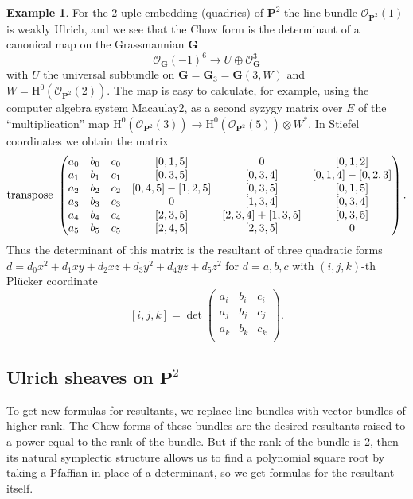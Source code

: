 \documentclass{jams-l}
\theoremstyle{definition}
\newtheorem{example}[theorem]{Example}
\theoremstyle{remark}
\newcommand{\GG}{{\mathbf G}}
\newcommand{\Hrm}{{\mathrm H}}
\newcommand{\Ocal}{{\mathcal O}}
\newcommand{\cO}{{\mathcal O}}
\newcommand{\PP}{{\mathbf P}}
\newcommand{\tensor}{\otimes}
\begin{document}
\begin{example}\label{quadrics on P2}
For the 2-uple embedding (quadrics) of
$\PP^2$ the line bundle $\Ocal_{\PP^2}(1)$ is weakly Ulrich,
and we see that the Chow form is the determinant
of a canonical map on the Grassmannian $\GG$
\[
\Ocal_\GG(-1)^6\to U \oplus \Ocal_\GG^3
\]
with $U$ the universal subbundle on $\GG=\GG_3=\GG(3,W)$ and $W=\Hrm^0(\cO_{\PP^2}(2))$.
The map is easy to calculate, for example,
using the computer algebra system Macaulay2,
 as a second syzygy matrix over $E$ of the ``multiplication'' map \linebreak
$\Hrm^0(\cO_{\PP^2}(3)) \to \Hrm^0(\cO_{\PP^2}(5)) \tensor W^*$.
In Stiefel coordinates we obtain the matrix 
\[\hbox{transpose }\begin{pmatrix}
a_0 & b_0 & c_0 & {\scriptstyle[0,1,5]}           &0                  &{\scriptstyle [0,1,2] }\\
a_1 & b_1 & c_1 &{\scriptstyle [0,3,5]}           &{\scriptstyle [0,3,4]
}         & {\scriptstyle [0,1,4]-[0,2,3] }\\
a_2 & b_2 & c_2 &{\scriptstyle [0,4,5]-[1,2,5]} &{\scriptstyle [0,3,5] }         & {\scriptstyle  [0,1,5] }\\          
a_3 & b_3 & c_3 & 0                   &{\scriptstyle [1,3,4]}          &{\scriptstyle [0,3,4] }\\       
a_4 & b_4 & c_4 &{\scriptstyle [2,3,5]}           & {\scriptstyle[2,3,4]+[1,3,5]} &{\scriptstyle [0,3,5]} \\        
a_5 & b_5 & c_5 &{\scriptstyle [2,4,5]}           &{\scriptstyle [2,3,5]}          &0       \\      
\end{pmatrix}.\]
Thus the determinant of this matrix
is the resultant of three quadratic forms
$d=d_0x^2+d_1xy+d_2xz+d_3y^2+d_4yz+d_5z^2$ for $d=a,b,c$
with $(i,j,k)$-th Pl\"ucker coordinate
\[[i,j,k]=\det \begin{pmatrix}
a_i & b_i & c_i \\
a_j & b_j & c_j \\
a_k & b_k & c_k \\ \end{pmatrix}.\]
\end{example}

\subsection*{Ulrich sheaves on ${\mathbf P}^2$}

To get new formulas for resultants, we replace line bundles
with vector bundles of higher rank. The Chow forms of these
bundles are the desired resultants raised to a power equal
to the rank of the bundle. But if the rank of the bundle is 2, then its
natural symplectic structure allows us to
find a polynomial square root by taking a Pfaffian in place
of a determinant, so we get formulas for the resultant itself.
\end{document}

